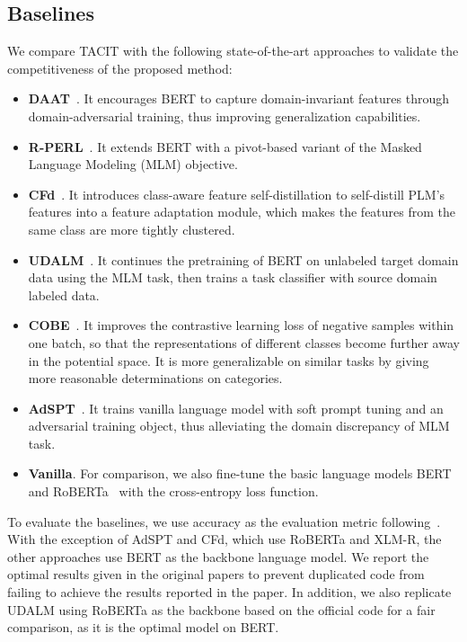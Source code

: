 \documentclass[letterpaper]{article} %
\begin{document}
\subsection{Baselines}\label{sec:baseline}
We compare TACIT with the following state-of-the-art approaches to validate the competitiveness of the proposed method:
\begin{itemize}
	\item \textbf{DAAT}~\cite{DuSWQL20}. It encourages BERT to capture domain-invariant features through domain-adversarial training, thus improving generalization capabilities.
	\item \textbf{R-PERL}~\cite{Ben-DavidRR20}. It extends BERT with a pivot-based variant of the Masked Language Modeling (MLM) objective.
	\item \textbf{CFd}~\cite{YeTHLNB20}. It introduces class-aware feature self-distillation to self-distill PLM's features into a	feature adaptation module, which makes the features from the same class are more tightly clustered.
	\item \textbf{UDALM}~\cite{KarouzosPP21}. It continues the pretraining of BERT on unlabeled target domain data using the MLM task, then trains a task classifier with source domain labeled data.
	\item \textbf{COBE}~\cite{LuoGL022}. It improves the contrastive learning loss of negative samples within one batch, so that the representations of different classes become further away in the potential space. It is more generalizable on similar tasks by giving more reasonable determinations on categories.
	\item \textbf{AdSPT}~\cite{WuS22}. It trains vanilla language model with soft prompt tuning and an adversarial training object, thus alleviating the domain discrepancy
	of MLM task.
	\item \textbf{Vanilla}. For comparison, we also fine-tune the basic language models BERT~\cite{DevlinCLT19} and RoBERTa~\cite{RoBERTa} with the cross-entropy loss function.
\end{itemize}
To evaluate the baselines, we use accuracy as the evaluation metric following~\cite{KarouzosPP21, WuS22}. With the exception of AdSPT and CFd, which use RoBERTa and XLM-R, the other approaches use BERT as the backbone language model. We report the optimal results given in the original papers to prevent duplicated code from failing to achieve the results reported in the paper. In addition, we also replicate UDALM using RoBERTa as the backbone based on the official code for a fair comparison, as it is the optimal model on BERT.
\end{document}
